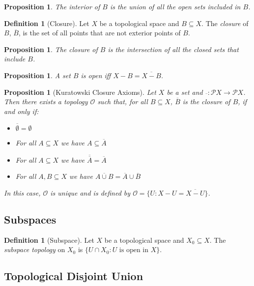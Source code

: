 \documentclass{book}
\newtheorem{prop}[ax]{Proposition}
\theoremstyle{definition}
\newtheorem{df}[ax]{Definition}
\begin{document}
\begin{prop}
The interior of $B$ is the union of all the open sets included in $B$.
\end{prop}

\begin{df}[Closure]
Let $X$ be a topological space and $B \subseteq X$. The \emph{closure} of $B$, $\overline{B}$, is the set of all points that are not exterior points of $B$.
\end{df}

\begin{prop}
The closure of $B$ is the intersection of all the closed sets that include $B$.
\end{prop}

\begin{prop}
A set $B$ is open iff $X - B = \overline{X - B}$.
\end{prop}

\begin{prop}[Kuratowski Closure Axioms]
Let $X$ be a set and $\overline{\ } : \mathcal{P} X \rightarrow \mathcal{P} X$. Then there exists a topology $\mathcal{O}$ such that, for all $B \subseteq X$, $\overline{B}$ is the closure of $B$, if and only if:
\begin{itemize}
\item $\overline{\emptyset} = \emptyset$
\item For all $A \subseteq X$ we have $A \subseteq \overline{A}$
\item For all $A \subseteq X$ we have $\overline{\overline{A}} = \overline{A}$
\item For all $A, B \subseteq X$ we have $\overline{A \cup B} = \overline{A} \cup \overline{B}$
\end{itemize}
In this case, $\mathcal{O}$ is unique and is defined by $\mathcal{O} = \{ U : X - U = \overline{X - U} \}$.
\end{prop}

\subsection{Subspaces}

\begin{df}[Subspace]
Let $X$ be a topological space and $X_0 \subseteq X$. The \emph{subspace topology} on $X_0$ is $\{ U \cap X_0 : U \text{ is open in } X \}$.
\end{df}

\subsection{Topological Disjoint Union}
\end{document}
